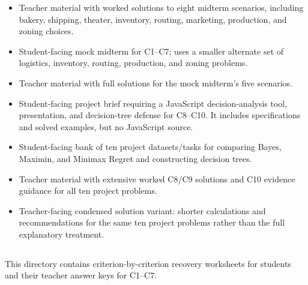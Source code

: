 \begin{itemize}
  \item {}

  Teacher material with worked solutions to eight midterm scenarios, including bakery, shipping, theater, inventory, routing, marketing, production, and zoning choices.

  \item {}

  Student-facing mock midterm for C1–C7; uses a smaller alternate set of logistics, inventory, routing, production, and zoning problems.

  \item {}

  Teacher material with full solutions for the mock midterm’s five scenarios.

  \item {}

  Student-facing project brief requiring a JavaScript decision-analysis tool, presentation, and decision-tree defense for C8–C10. It includes specifications and solved examples, but no JavaScript source.

  \item {}

  Student-facing bank of ten project datasets/tasks for comparing Bayes, Maximin, and Minimax Regret and constructing decision trees.

  \item {}

  Teacher material with extensive worked C8/C9 solutions and C10 evidence guidance for all ten project problems.

  \item {}

  Teacher-facing condensed solution variant: shorter calculations and recommendations for the same ten project problems rather than the full explanatory treatment.
\end{itemize}

\subsection{}

This directory contains criterion-by-criterion recovery worksheets for students and their teacher answer keys for C1–C7.

